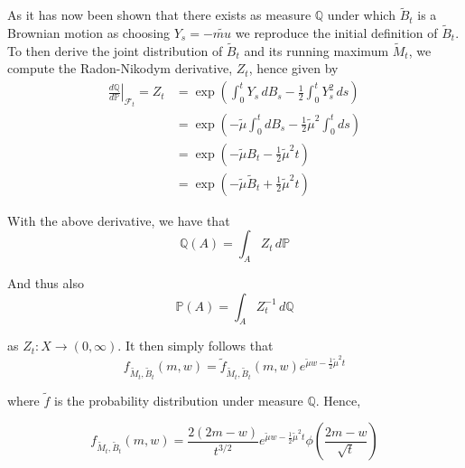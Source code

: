 \documentclass[../Thesis.tex]{subfiles}
\begin{document}
As it has now been shown that there exists as measure $\mathbb{Q}$ under which $\tilde{B}_t$ is a Brownian motion as choosing $Y_s = -\tilde{mu}$ we reproduce the initial definition of $\tilde{B}_t$. To then derive the joint distribution of $\tilde{B}_t$ and its running maximum $\tilde{M}_t$, we compute the Radon-Nikodym derivative, $Z_t$, hence given by
\begin{align*}
    \left.\frac{d\mathbb{Q}}{d\mathbb{P}}\right\vert_{\mathcal{F}_t} = Z_t & = \exp \left( \int_0^t Y_s \, dB_s - \frac{1}{2} \int_0^t Y_s^2 \, ds\right)               \\
                                                                           & = \exp \left( -\tilde{\mu} \int_0^t  dB_s - \frac{1}{2} \tilde{\mu}^2 \int_0^t   ds\right) \\
                                                                           & = \exp \left( -\tilde{\mu} B_t - \frac{1}{2} \tilde{\mu}^2 t\right)                        \\
                                                                           & = \exp \left( -\tilde{\mu} \tilde{B}_t + \frac{1}{2} \tilde{\mu}^2 t\right)
\end{align*}

With the above derivative, we have that
$$\mathbb{Q}\left(A\right) = \int_A Z_t\, d\mathbb{P}$$

And thus also
$$\mathbb{P}\left(A\right) = \int_A Z_t^{-1}\, d\mathbb{Q}$$

as $Z_t : X \to (0,\infty)$. It then simply follows that
$$f_{\tilde{M}_t,\tilde{B}_t}(m,w) = \tilde{f}_{\tilde{M}_t,\tilde{B}_t}(m,w) e^{\tilde{\mu} w -\frac{1}{2}\tilde{\mu}^2 t}$$

where $\tilde{f}$ is the probability distribution under measure $\mathbb{Q}$. Hence,

$$f_{\tilde{M}_t, \tilde{B}_t}(m,w) = \frac{2(2m-w)}{t^{3/2}} e^{\tilde{\mu} w - \frac{1}{2}\tilde{\mu}^2 t} \phi\left(\frac{2m-w}{\sqrt{t}}\right)$$










\end{document}
